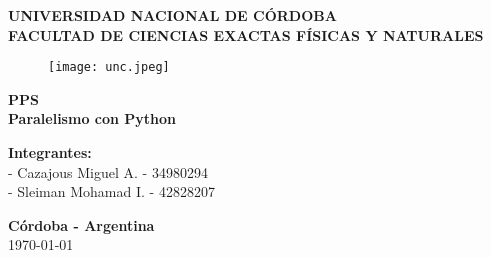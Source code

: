\begin{titlepage}
  \begin{center}
    \vspace*{0.3cm}
    \Huge\textbf {UNIVERSIDAD NACIONAL DE C\'ORDOBA}\\
    \vspace*{0.3cm}
    \Large\textbf {FACULTAD DE CIENCIAS EXACTAS F\'ISICAS Y NATURALES}\\
    \vspace*{0.15cm}
    \begin{figure}[htb]
      \begin{center}
        \texttt{[image: unc.jpeg]}
      \end{center}
    \end{figure}
    \Large\textbf {PPS}\\
    \vspace*{0.3cm}
    \large\textbf {Paralelismo con Python}\\
    \vspace*{2cm}
  \end{center}
  \begin{flushleft}
    \large\textbf {Integrantes:}\\
    \hspace{3cm}- Cazajous Miguel A. - 34980294\\
    \hspace{3cm}- Sleiman Mohamad I. - 42828207\\
  \end{flushleft}
  \begin{center}
    \begin{large}
      \vspace*{0.4cm}
      \small\textbf {C\'ordoba - Argentina}\\
      \small\today
    \end{large}
  \end{center}
\end{titlepage}
